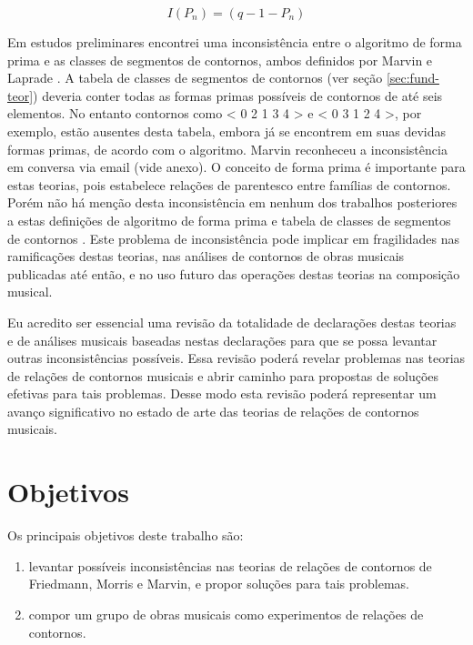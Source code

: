 \documentclass[12pt]{article}
\begin{document}
\begin{equation}
  \label{eq:1}
  I(P_n) = (q − 1 − P_n)
\end{equation}

Em estudos preliminares encontrei uma inconsistência entre o algoritmo
de forma prima e as classes de segmentos de contornos, ambos definidos
por Marvin e Laprade \cite{marvin.ea87:relating}. A tabela de classes
de segmentos de contornos (ver seção \ref{sec:fund-teor}) deveria
conter todas as formas primas possíveis de contornos de até seis
elementos. No entanto contornos como < 0 2 1 3 4 > e < 0 3 1 2 4 >,
por exemplo, estão ausentes desta tabela, embora já se encontrem em
suas devidas formas primas, de acordo com o algoritmo. Marvin
reconheceu a inconsistência em conversa via email (vide anexo). O
conceito de forma prima é importante para estas teorias, pois
estabelece relações de parentesco entre famílias de contornos. Porém
não há menção desta inconsistência em nenhum dos trabalhos posteriores
a estas definições de algoritmo de forma prima e tabela de classes de
segmentos de contornos
\cite{polansky.ea92:possible,clifford95:contour,quinn97:fuzzy,beard03:contour,bor09:contour,schultz08:melodic,schultz09:diachronic}. Este
problema de inconsistência pode implicar em fragilidades nas
ramificações destas teorias, nas análises de contornos de obras
musicais publicadas até então, e no uso futuro das operações destas
teorias na composição musical.

Eu acredito ser essencial uma revisão da totalidade de declarações
destas teorias e de análises musicais baseadas nestas declarações para
que se possa levantar outras inconsistências possíveis. Essa revisão
poderá revelar problemas nas teorias de relações de contornos musicais
e abrir caminho para propostas de soluções efetivas para tais
problemas. Desse modo esta revisão poderá representar um avanço
significativo no estado de arte das teorias de relações de contornos
musicais.

\section{Objetivos}
\label{sec:objetivos}

Os principais objetivos deste trabalho são:

\begin{enumerate}
\item levantar possíveis inconsistências nas teorias de relações de
  contornos de Friedmann, Morris e Marvin, e propor soluções para tais
  problemas.
\item compor um grupo de obras musicais como experimentos de relações
  de contornos.
\end{enumerate}
\end{document}
